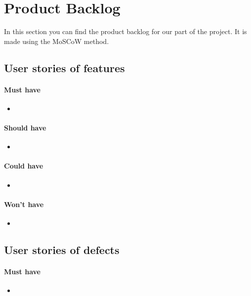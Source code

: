 \section{Product Backlog}
In this section you can find the product backlog for our part of the project. It is made using the MoSCoW method.

\subsection{User stories of features}
\paragraph{Must have} 
\begin{itemize}
\item 
\end{itemize}

\paragraph{Should have} 
\begin{itemize}
\item 
\end{itemize}

\paragraph{Could have} 
\begin{itemize}
\item
\end{itemize}

\paragraph{Won't have} 
\begin{itemize}
\item
\end{itemize}

\subsection{User stories of defects}
\paragraph{Must have} 
\begin{itemize}
\item 
\end{itemize}

